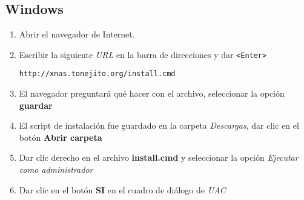       \subsection {Windows}

%

{
\linespread{0.1}
\begin{enumerate}

  \item Abrir el navegador de Internet.


  \item Escribir la siguiente \textit{URL} en la barra de direcciones y dar \texttt{<Enter>}

    \texttt{http://xnas.tonejito.org/install.cmd}


  \item El navegador preguntar\'{a} qu\'{e} hacer con el archivo, seleccionar la opci\'{o}n \textbf{guardar}


  \item El script de instalaci\'{o}n fue guardado en la carpeta \textsl{Descargas}, dar clic en el bot\'{o}n \textbf{Abrir carpeta}


%

  \item Dar clic derecho en el archivo \textbf{install.cmd} y seleccionar la opci\'{o}n \textsl{Ejecutar como administrador}


  \item Dar clic en el bot\'{o}n \textbf{SI} en el cuadro de di\'{a}logo de \textit{UAC}



\end{enumerate}}

